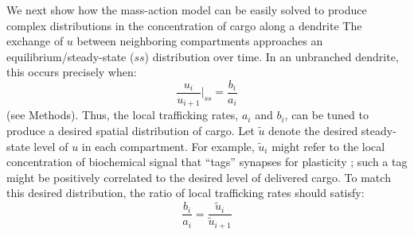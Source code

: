 \documentclass[11pt]{wlpeerj}
\begin{document}
We next show how the mass-action model can be easily solved to produce complex distributions in the concentration of cargo along a dendrite
The exchange of $u$ between neighboring compartments approaches an equilibrium/steady-state ($ss$) distribution over time. In an unbranched dendrite, this occurs precisely when:
\begin{equation}
\frac{u_i}{u_{i+1}} \Bigg|_{ss} = \frac{b_i}{a_i}
\end{equation}
(see Methods). Thus, the local trafficking rates, $a_i$ and $b_i$, can be tuned to produce a desired spatial distribution of cargo. Let $\tilde{u}$ denote the desired steady-state level of $u$ in each compartment. For example, $\tilde{u}_i$ might refer to the local concentration of biochemical signal that ``tags'' synapses for plasticity \citep{Frey_1997}; such a tag might be positively correlated to the desired level of delivered cargo. To match this desired distribution, the ratio of local trafficking rates should satisfy:
\begin{equation}
\frac{b_i}{a_i} = \frac{\tilde{u}_i}{\tilde{u}_{i+1}}
\end{equation}
\end{document}
